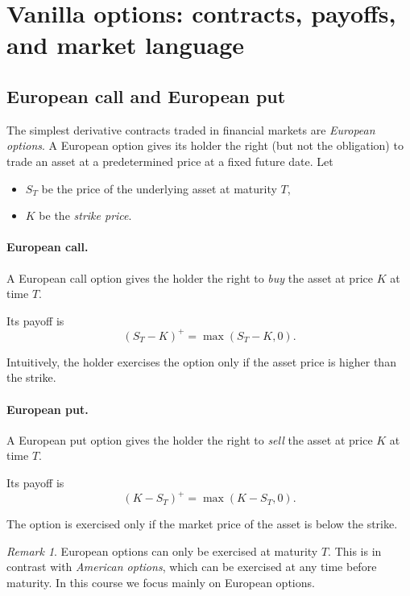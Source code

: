 \documentclass[11pt]{article}
\newcommand{\1}{\mathbf{1}}
\theoremstyle{plain}
\theoremstyle{definition}
\theoremstyle{remark}
\newtheorem{remark}[theorem]{Remark}
\begin{document}
\section{Vanilla options: contracts, payoffs, and market language}

\subsection{European call and European put}

The simplest derivative contracts traded in financial markets are
\emph{European options}.  
A European option gives its holder the right (but not the obligation)
to trade an asset at a predetermined price at a fixed future date.
Let
\begin{itemize}[leftmargin=1.4em]
    \item \(S_T\) be the price of the underlying asset at maturity \(T\),
    \item \(K\) be the \emph{strike price}.
\end{itemize}

\paragraph{European call.}
A European call option gives the holder the right to \emph{buy}
the asset at price \(K\) at time \(T\).

Its payoff is
\[
(S_T-K)^+ = \max(S_T-K,0).
\]

Intuitively, the holder exercises the option only if the asset price
is higher than the strike.

\paragraph{European put.}
A European put option gives the holder the right to \emph{sell}
the asset at price \(K\) at time \(T\).

Its payoff is
\[
(K-S_T)^+ = \max(K-S_T,0).
\]

The option is exercised only if the market price of the asset
is below the strike.

\begin{remark}
European options can only be exercised at maturity \(T\).
This is in contrast with \emph{American options}, which can be exercised
at any time before maturity.
In this course we focus mainly on European options.
\end{remark}
\end{document}
